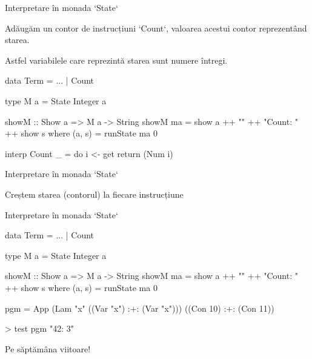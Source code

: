 \documentclass[xcolor=pdftex,romanian,colorlinks]{beamer}
\begin{document}
 


\begin{frame}[fragile]{Interpretare în monada `State`}


Adăugăm un contor de instrucțiuni `Count`, valoarea acestui contor reprezentând starea.

Astfel variabilele care reprezintă starea sunt numere întregi. 

\begin{asciihs}
data Term = ... | Count

type M a = State Integer a

showM :: Show a => M a -> String
showM ma = show a ++ "\n" ++ "Count: " ++ show s
           where (a, s) = runState ma 0

interp Count _ = do
                  i <- get
                  return (Num i)
\end{asciihs}
\end{frame}

\begin{frame}[fragile]{Interpretare în monada `State`}


Creștem starea (contorul) la fiecare instrucțiune

\end{frame}

\begin{frame}[fragile]{Interpretare în monada `State`}


\begin{asciihs}
data Term = ... | Count

type M a = State Integer a

showM :: Show a => M a -> String
showM ma = show a ++ "\n" ++ "Count: " ++ show s
           where (a, s) = runState ma 0
\end{asciihs}


\begin{asciihs}
pgm = App 
          (Lam "x" ((Var "x") :+: (Var "x")))
          ((Con 10) :+:  (Con 11))

> test pgm
"42\nCount: 3"
\end{asciihs}

\end{frame}

 \begin{frame}
  \vfill
  \centering
     Pe săptămâna viitoare! \par%
  \vfill
  \end{frame}
\end{document}
